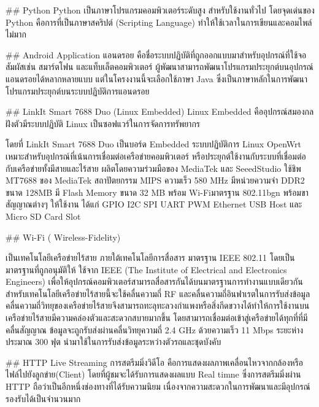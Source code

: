 ## Python 
	Python เป็นภาษาโปรแกรมคอมพิวเตอร์ระดับสูง สำหรับใช้งานทั่วไป
	โดยจุดเด่นของ Python คือการที่เป็นภาษาสคริปต์ (Scripting Language)
	ทำให้ใช้เวลาในการเขียนและคอมไพล์ไม่มาก

## Android Application
    แอนดรอย คือชื่อระบบปฏิบัติที่ถูกออกแบบมาสำหรับอุปกรณ์ที่ใช้จอสัมผัสเช่น สมาร์ตโฟน และแท็บเล็ตคอมพิวเตอร์ ผู้พัฒนาสามารถพัฒนาโปรแกรมประยุกต์บนอุปกรณ์แอนดรอยได้หลากหลายแบบ แต่ในโครงงานนี้จะเลือกใช้ภาษา Java ซึ่งเป็นภาษาหลักในการพัฒนาโปรแกรมประยุกต์บนระบบปฏิบัติการแอนดรอย


## LinkIt Smart 7688 Duo (Linux Embedded)
    Linux Embedded คืออุปกรณ์สมองกลฝังตัวมีระบบปฏิบัติ Linux เป็นซอฟแวร์ในการจัดการทรัพยากร 

    โดยที่ LinkIt Smart 7688 Duo เป็นบอร์ด Embedded ระบบปฏิบัติการ Linux OpenWrt  เหมาะสำหรับอุปกรณ์ที่เน้นการเชื่อมต่อเครือข่ายคอมพิวเตอร์ หรือประยุกต์ใช้งานกับระบบที่เชื่อมต่อกับเครือข่ายทั้งมีสายและไร้สาย ผลิตโดยความร่วมมือของ MediaTek และ SeeedStudio ใช้ชิพ MT7688 ของ MediaTek สถาปัตยกรรม MIPS ความเร็ว 580 MHz มีหน่วยความจำ DDR2 ขนาด 128MB มี Flash Memory ขนาด 32 MB พร้อม Wi-Fiมาตรฐาน 802.11bgn พร้อมขาสัญญาณต่างๆ ให้ใช้งาน ได้แก่ GPIO I2C SPI UART PWM Ethernet USB Host และ Micro SD Card Slot

## Wi-Fi  ( Wireless-Fidelity)  

    เป็นเทคโนโลยีเครือข่ายไร้สาย  ภายใต้เทคโนโลยีการสื่อสาร มาตรฐาน IEEE  802.11  โดยเป็นมาตรฐานที่ถูกอนุมัติให้ ใช้จาก IEEE (The Institute of Electrical and Electronics Engineers) เพื่อให้อุปกรณ์คอมพิวเตอร์สามารถสื่อสารกันได้บนมาตรฐานการทำงานแบบเดียวกัน  สำหรับเทคโนโลยีเครือข่ายไร้สายนี้จะใช้คลื่นความถี่ RF และคลื่นความถี่อินฟาเรตในการรับส่งข้อมูลคลื่นความถี่วิทยุของเครือข่ายไร้สายจึงสามารถทะลุทะลวงกำแพงหรือสิ่งกีดขวางได้ทำให้การใช้งานบนเครือข่ายไร้สายมีความคล่องตัวและสะดวกสบายมากขึ้น โดยสามารถเชื่อมต่อเข้าสู่เครือข่ายได้ทุกที่ที่มีคลื่นสัญญาณ  ข้อมูลจะถูกรับส่งผ่านคลื่นวิทยุความถี่   2.4 GHz  ด้วยความเร็ว  11 Mbps  ระยะห่างประมาณ  300 ฟุต นำมาใช้ในการรับส่งข้อมูลระหว่างตัวรถและชุดบังคับ
 
## HTTP Live Streaming
    การสตรีมมิ่งวิดีโอ คือการแสดงผลภาพเคลื่อนไหวจากกล้องหรือไฟล์ไปยังลูกข่าย(Client) โดยที่ผู้ชมจะได้รับการแสดงผลแบบ Real timne ซึ่งการสตรีมมิ่งผ่าน HTTP ถือว่าเป็นอีกหนึ่งช่องทางที่ได้รับความนิยม เนื่องจากความสะดวกในการพัฒนาและมีอุปกรณ์รองรับได้เป็นจำนวนมาก

